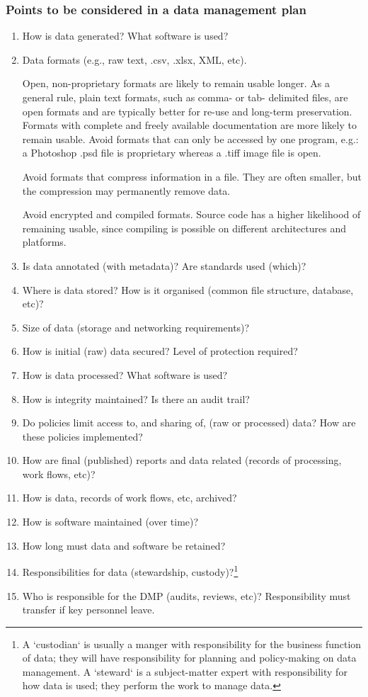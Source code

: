 \subsubsection{Points to be considered in a data management plan}
\begin{enumerate}
 \item How is data generated? What software is used? 
 \item Data formats (e.g., raw text, .csv, .xlsx, XML, etc). 
 
Open, non-proprietary formats are likely to remain usable longer. As a general rule, plain text formats, such as comma- or tab- delimited files, are open formats and are typically better for re-use and long-term preservation. Formats with complete and freely available documentation are more likely to remain usable. Avoid formats that can only be accessed by one program, e.g.: a Photoshop .psd file is proprietary whereas a .tiff image file is open.

Avoid formats that compress information in a file. They are often smaller, but the compression may permanently remove data. 

Avoid encrypted and compiled formats. Source code has a higher likelihood of remaining usable, since compiling is possible on different architectures and platforms.

 \item Is data annotated (with metadata)? Are standards used (which)? 
 \item Where is data stored? How is it organised (common file structure, database, etc)? 
 \item Size of data (storage and networking requirements)? 
 \item How is initial (raw) data secured? Level of protection required? 
 \item How is data processed? What software is used? 
 \item How is integrity maintained? Is there an audit trail?
 \item Do policies limit access to, and sharing of, (raw or processed) data? How are these policies implemented?
 \item How are final (published) reports and data related (records of processing, work flows, etc)?
 \item How is data, records of work flows, etc, archived? 
 \item How is software maintained (over time)?
 \item How long must data and software be retained?  
 \item Responsibilities for data (stewardship, custody)?\footnote{A `custodian`  is usually a manger with responsibility for the business function of data; they will have responsibility for planning and policy-making on data management. A `steward` is a subject-matter expert with responsibility for how data is used; they perform the work to manage data.}
 \item Who is responsible for the DMP (audits, reviews, etc)? Responsibility must transfer if key personnel leave. 
\end{enumerate}

